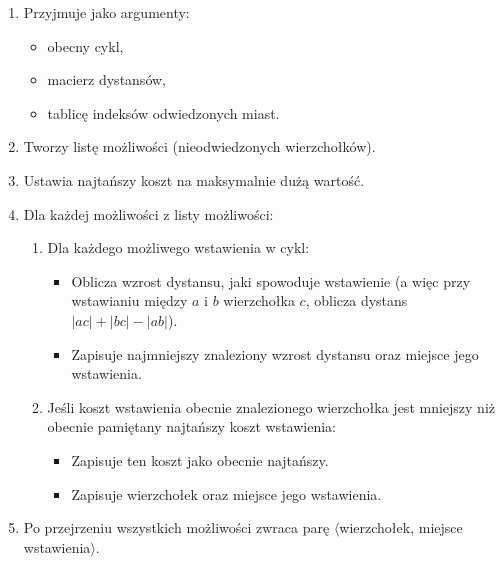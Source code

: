 \documentclass[11pt]{article}
\begin{document}
\begin{enumerate}
    \item Przyjmuje jako argumenty:
    \begin{itemize}
        \item obecny cykl,
        \item macierz dystansów,
        \item tablicę indeksów odwiedzonych miast.
    \end{itemize}
    \item Tworzy listę możliwości (nieodwiedzonych wierzchołków).
    \item Ustawia najtańszy koszt na maksymalnie dużą wartość.
    \item Dla każdej możliwości z listy możliwości:
    \begin{enumerate}
        \item Dla każdego możliwego wstawienia w cykl:
        \begin{itemize}
            \item Oblicza wzrost dystansu, jaki spowoduje wstawienie (a więc przy wstawianiu między \(a\) i \(b\) wierzchołka \(c\), oblicza dystans \(|ac| + |bc| - |ab|\)).
            \item Zapisuje najmniejszy znaleziony wzrost dystansu oraz miejsce jego wstawienia.
        \end{itemize}
        \item Jeśli koszt wstawienia obecnie znalezionego wierzchołka jest mniejszy niż obecnie pamiętany najtańszy koszt wstawienia:
        \begin{itemize}
            \item Zapisuje ten koszt jako obecnie najtańszy.
            \item Zapisuje wierzchołek oraz miejsce jego wstawienia.
        \end{itemize}
    \end{enumerate}
    \item Po przejrzeniu wszystkich możliwości zwraca parę \(\langle\)wierzchołek, miejsce wstawienia\(\rangle\).
\end{enumerate}
\end{document}

